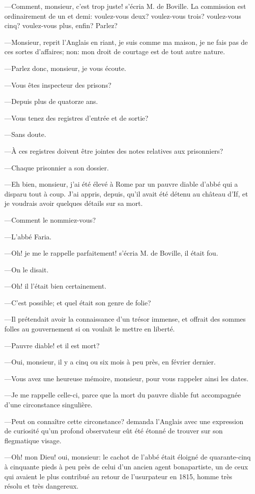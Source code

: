 —Comment, monsieur, c'est trop juste! s'écria M. de Boville. La commission est ordinairement de un et demi: voulez-vous deux? voulez-vous trois? voulez-vous cinq? voulez-vous plus, enfin? Parlez?

—Monsieur, reprit l'Anglais en riant, je suis comme ma maison, je ne fais pas de ces sortes d'affaires; non: mon droit de courtage est de tout autre nature.

—Parlez donc, monsieur, je vous écoute.

—Vous êtes inspecteur des prisons?

—Depuis plus de quatorze ans.

—Vous tenez des registres d'entrée et de sortie?

—Sans doute.

—À ces registres doivent être jointes des notes relatives aux prisonniers?

—Chaque prisonnier a son dossier.

—Eh bien, monsieur, j'ai été élevé à Rome par un pauvre diable d'abbé qui a disparu tout à coup. J'ai appris, depuis, qu'il avait été détenu au château d'If, et je voudrais avoir quelques détails sur sa mort.

—Comment le nommiez-vous?

—L'abbé Faria.

—Oh! je me le rappelle parfaitement! s'écria M. de Boville, il était fou.

—On le disait.

—Oh! il l'était bien certainement.

—C'est possible; et quel était son genre de folie?

—Il prétendait avoir la connaissance d'un trésor immense, et offrait des sommes folles au gouvernement si on voulait le mettre en liberté.

—Pauvre diable! et il est mort?

—Oui, monsieur, il y a cinq ou six mois à peu près, en février dernier.

—Vous avez une heureuse mémoire, monsieur, pour vous rappeler ainsi les dates.

—Je me rappelle celle-ci, parce que la mort du pauvre diable fut accompagnée d'une circonstance singulière.

—Peut on connaître cette circonstance? demanda l'Anglais avec une expression de curiosité qu'un profond observateur eût été étonné de trouver sur son flegmatique visage.

—Oh! mon Dieu! oui, monsieur: le cachot de l'abbé était éloigné de quarante-cinq à cinquante pieds à peu près de celui d'un ancien agent bonapartiste, un de ceux qui avaient le plus contribué au retour de l'usurpateur en 1815, homme très résolu et très dangereux.

